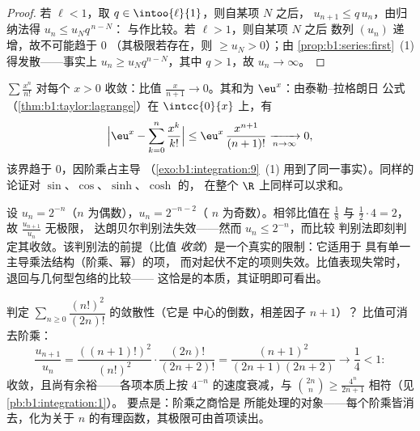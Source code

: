 \begin{proof}
若 $\ell < 1$，取 $q \in \intoo{\ell}{1}$，则自某项 $N$ 之后，
$u_{n+1} \leq q\,u_n$，由归纳法得 $u_n \leq u_N q^{\,n-N}$：
与作比较。若 $\ell > 1$，则自某项 $N$ 之后
数列 $(u_n)$ 递增，故不可能趋于 $0$
（其极限若存在，则 $\geq u_N > 0$）；由
\cref{prop:b1:series:first}~(1)得发散——事实上 $u_n
\geq u_N q^{n-N}$，其中 $q > 1$，故 $u_n \to \infty$。
\end{proof}

\begin{example}\label{ex:b1:series:ratio}
$\sum \frac{x^n}{n!}$ 对每个 $x > 0$ 收敛：比值
$\frac{x}{n+1} \to 0$。其和为 $\eu^x$：由泰勒–拉格朗日
公式（\cref{thm:b1:taylor:lagrange}）在 $\intcc{0}{x}$ 上，有
\[
\Bigl| \eu^x - \sum_{k=0}^{n} \frac{x^k}{k!} \Bigr|
\leq \eu^{x}\, \frac{x^{n+1}}{(n+1)!} \xrightarrow[n\to\infty]{} 0 ,
\]
该界趋于 $0$，因阶乘占主导
（\cref{exo:b1:integration:9}~(1) 用到了同一事实）。同样的
论证对 $\sin$、$\cos$、$\sinh$、$\cosh$ 的，
在整个 $\R$ 上同样可以求和。
\end{example}

\begin{example}\label{ex:b1:series:rationotnecessary}
设 $u_n = 2^{-n}$（$n$ 为偶数），$u_n = 2^{-n-2}$（
$n$ 为奇数）。相邻比值在 $\frac{1}{8}$ 与
$\frac12\cdot4 = 2$，故 $\frac{u_{n+1}}{u_n}$ 无极限，
达朗贝尔判别法失效——然而 $u_n \leq 2^{-n}$，而比较
判别法即刻判定其收敛。该判别法的前提（比值
\emph{收敛}）是一个真实的限制：它适用于
具有单一主导乘法结构（阶乘、幂）的项，
而对起伏不定的项则失效。比值表现失常时，
退回与几何型包络的比较——
这恰是的本质，其证明即可看出。
\end{example}

\begin{example}[阶乘对决中的比值判别法]\label{ex:b1:series:ratiobinom}
判定 $\sum_{n\geq0} \dfrac{(n!)^2}{(2n)!}$ 的敛散性（它是
中心的倒数，相差因子 $n + 1$）？
比值可消去阶乘：
\[
\frac{u_{n+1}}{u_n}
= \frac{((n+1)!)^2}{(n!)^2}\cdot\frac{(2n)!}{(2n+2)!}
= \frac{(n+1)^2}{(2n+1)(2n+2)}
\longrightarrow \frac14 < 1 :
\]
收敛，且尚有余裕——各项本质上按
$4^{-n}$ 的速度衰减，与 $\binom{2n}{n} \geq
\frac{4^n}{2n+1}$ 相符（见\cref{pb:b1:integration:1}）。
要点是：阶乘之商恰是
所能处理的对象——每个阶乘皆消去，化为关于
$n$ 的有理函数，其极限可由首项读出。
\end{example}

